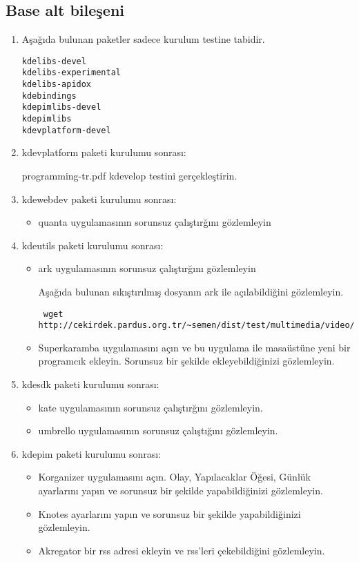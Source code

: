 \documentclass[a4paper,10pt]{article}
\begin{document}
\subsection*{Base alt bileşeni}

\begin{enumerate} 
\item  Aşağıda bulunan paketler sadece kurulum testine tabidir.
\begin{verbatim}
kdelibs-devel
kdelibs-experimental
kdelibs-apidox 
kdebindings
kdepimlibs-devel
kdepimlibs
kdevplatform-devel
\end{verbatim}
\item kdevplatform paketi kurulumu sonrası:

programming-tr.pdf  kdevelop testini gerçekleştirin.

\item kdewebdev paketi kurulumu sonrası:
\begin{itemize}
 \item quanta uygulamasının sorunsuz çalıştırğını gözlemleyin
\end{itemize}

\item kdeutils paketi kurulumu sonrası:

\begin{itemize}
 \item ark uygulamasının sorunsuz çalıştırğını gözlemleyin

Aşağıda bulunan sıkıştırılmış dosyanın ark ile açılabildiğini gözlemleyin.
\begin{verbatim}
 wget http://cekirdek.pardus.org.tr/~semen/dist/test/multimedia/video/cokluortam.tar
\end{verbatim}

 \item Superkaramba uygulamasını açın ve bu uygulama ile masaüstüne yeni bir programcık ekleyin. Sorunsuz bir şekilde ekleyebildiğinizi gözlemleyin.
\end{itemize}

\item kdesdk paketi kurulumu sonrası:
\begin{itemize}
 \item kate uygulamasının sorunsuz çalıştırğını gözlemleyin.
 \item umbrello uygulamasının sorunsuz çalıştığını gözlemleyin.
\end{itemize}

\item kdepim paketi kurulumu sonrası:
\begin{itemize}
 \item Korganizer uygulamasını açın. Olay, Yapılacaklar Öğesi, Günlük ayarlarını yapın ve sorunsuz bir şekilde yapabildiğinizi gözlemleyin.
 \item Knotes ayarlarını yapın ve sorunsuz bir şekilde yapabildiğinizi gözlemleyin.
 \item Akregator bir rss adresi ekleyin ve rss'leri çekebildiğini gözlemleyin.
\end{itemize}


\end{enumerate}
\end{document}
